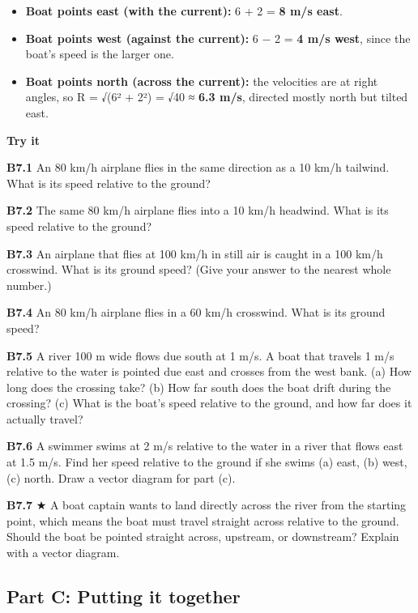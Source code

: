 \documentclass[
]{article}
\providecommand{\tightlist}{%
  \setlength{\itemsep}{0pt}\setlength{\parskip}{0pt}}
\begin{document}
\begin{itemize}
\tightlist
\item
  \textbf{Boat points east (with the current):} 6 + 2 = \textbf{8 m/s
  east}.
\item
  \textbf{Boat points west (against the current):} 6 − 2 = \textbf{4 m/s
  west}, since the boat's speed is the larger one.
\item
  \textbf{Boat points north (across the current):} the velocities are at
  right angles, so R = √(6² + 2²) = √40 ≈ \textbf{6.3 m/s}, directed
  mostly north but tilted east.
\end{itemize}

\textbf{Try it}

\textbf{B7.1} An 80 km/h airplane flies in the same direction as a 10
km/h tailwind. What is its speed relative to the ground?

\textbf{B7.2} The same 80 km/h airplane flies into a 10 km/h headwind.
What is its speed relative to the ground?

\textbf{B7.3} An airplane that flies at 100 km/h in still air is caught
in a 100 km/h crosswind. What is its ground speed? (Give your answer to
the nearest whole number.)

\textbf{B7.4} An 80 km/h airplane flies in a 60 km/h crosswind. What is
its ground speed?

\textbf{B7.5} A river 100 m wide flows due south at 1 m/s. A boat that
travels 1 m/s relative to the water is pointed due east and crosses from
the west bank. (a) How long does the crossing take? (b) How far south
does the boat drift during the crossing? (c) What is the boat's speed
relative to the ground, and how far does it actually travel?

\textbf{B7.6} A swimmer swims at 2 m/s relative to the water in a river
that flows east at 1.5 m/s. Find her speed relative to the ground if she
swims (a) east, (b) west, (c) north. Draw a vector diagram for part (c).

\textbf{B7.7} ★ A boat captain wants to land directly across the river
from the starting point, which means the boat must travel straight
across relative to the ground. Should the boat be pointed straight
across, upstream, or downstream? Explain with a vector diagram.

\subsection{Part C: Putting it
together}\label{part-c-putting-it-together}
\end{document}
